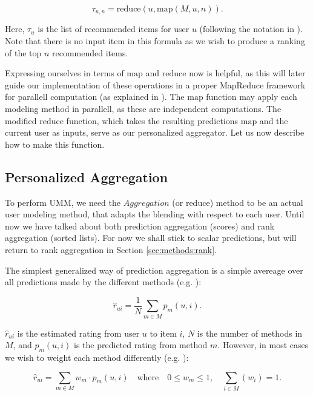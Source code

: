 \begin{equation*}
  \tau_{u,n} = \mathrm{reduce}(u, \mathrm{map}(M,u,n)).
\end{equation*}

Here, $\tau_{u}$ is the list of recommended items for user $u$ (following the notation in \citet[p3]{Dwork2001}).
Note that there is no input item in this formula as we wish to produce a ranking of the top $n$ recommended items.

Expressing ourselves in terms of $\mathrm{map}$ and $\mathrm{reduce}$ now is helpful, as this will later
guide our implementation of these operations in a proper MapReduce framework
for parallell computation (as explained in \citet[p75]{Manning2008}).
The $\mathrm{map}$ function may apply each modeling method in parallell, 
as these are independent computations.
The modified $\mathrm{reduce}$ function, which takes the resulting predictions $\mathrm{map}$ and the current
user as inputs, serve as our personalized aggregator.
Let us now describe how to make this function.


\subsection{Personalized Aggregation}

To perform UMM, we need the $Aggregation$ (or $\mathrm{reduce}$) method to be an actual user modeling method,
that adapts the blending with respect to each user.
Until now we have talked about both prediction aggregation (scores) and rank aggregation (sorted lists).
For now we shall stick to scalar predictions, but will return to rank aggregation in Section \ref{sec:methods:rank}.

The simplest generalized way of prediction aggregation is a simple avereage over all predictions made
by the different methods (e.g. \citet[p3]{Aslam2001}):

\begin{equation*}
  \hat{r}_{ui} = \frac{1}{N} \sum_{m \in M} p_m(u,i).
\end{equation*}

$\hat{r}_{ui}$ is the estimated rating from user $u$ to item $i$,
$N$ is the number of methods in $M$, and $p_m(u,i)$ is the predicted rating from method $m$.
However, in most cases we wish to weight each method differently (e.g. \cite{Claypool1999} ):

\begin{equation*}
  \hat{r}_{ui} = \sum_{m \in M} w_{m} \cdot p_m(u,i) 
  \quad \text{where} \quad 0 \leq w_{m} \leq 1, \quad \sum_{i \in M} (w_i) = 1.
\end{equation*}

